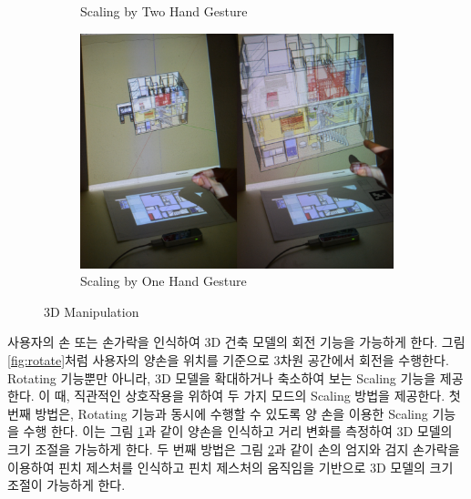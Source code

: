 \begin{figure}[!ht]
\begin{subfigure}[b]{0.32\textwidth}
                \caption{Scaling by Two Hand Gesture}
                \label{fig:scale_two_hand}
        \end{subfigure}
        \hfill
        \begin{subfigure}[b]{0.32\textwidth}
            \centering
            \includegraphics[width=\textwidth]{4-Interaction_Design/3d_scale_one_hand}
                \caption{Scaling by One Hand Gesture}
                \label{fig:scale_pinch}
        \end{subfigure}
	\caption{3D Manipulation}
    \label{fig:3d_mani}
\end{figure}

사용자의 손 또는 손가락을 인식하여 3D 건축 모델의 회전 기능을 가능하게 한다. 그림 \ref{fig:rotate}처럼 사용자의 양손을 위치를 기준으로 3차원 공간에서 회전을 수행한다. 
Rotating 기능뿐만 아니라, 3D 모델을 확대하거나 축소하여 보는 Scaling 기능을 제공한다. 이 때, 직관적인 상호작용을 위하여 두 가지 모드의 Scaling 방법을 제공한다. 첫 번째 방법은, Rotating 기능과 동시에 수행할 수 있도록 양 손을 이용한 Scaling 기능을 수행 한다. 이는 그림 \ref{fig:scale_two_hand}과 같이 양손을 인식하고 거리 변화를 측정하여 3D 모델의 크기 조절을 가능하게 한다. 두 번째 방법은 그림 \ref{fig:scale_pinch}과 같이 손의 엄지와 검지 손가락을 이용하여 핀치 제스처를 인식하고 핀치 제스처의 움직임을 기반으로 3D 모델의 크기 조절이 가능하게 한다.

